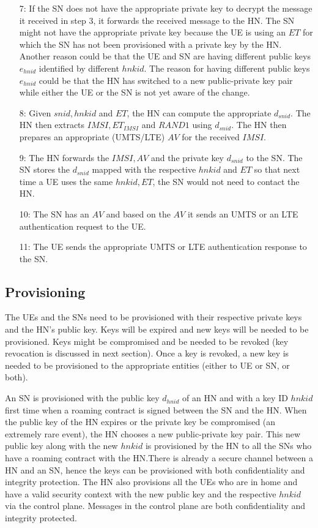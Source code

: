 \documentclass{river-journal}
\begin{document}
\begin{itemize}
\item[7:] If the SN does not have the appropriate private key to decrypt the message it received in step $3$, it forwards the received message to the HN. The SN might not have the appropriate private key because the UE is using an $ET$ for which the SN has not been provisioned with a private key by the HN. Another reason could be that the UE and SN are having different public keys $e_{hnid}$ identified by different $hnkid$. The reason for having different public keys $e_{hnid}$ could be that the HN has switched to a new public-private key pair while either the UE or the SN is not yet aware of the change.
\item[8:] Given $snid,hnkid$ and $ET$, the HN can compute the appropriate $d_{snid}$. The HN then extracts $IMSI,ET_{IMSI}$ and $RAND1$ using $d_{snid}$. The HN then prepares an appropriate (UMTS/LTE) $AV$ for the received $IMSI$.
\item[9:] The HN forwards the $IMSI,AV$ and the private key $d_{snid}$ to the SN. The SN stores the $d_{snid}$ mapped with the respective $hnkid$ and $ET$ so that next time a UE uses the same $hnkid,ET$, the SN would not need to contact the HN.
\item[10:] The SN has an $AV$ and based on the $AV$ it sends an UMTS or an LTE authentication request to the UE.
\item[11:] The UE sends the appropriate UMTS or LTE authentication response to the SN.
\end{itemize}


\subsection{Provisioning}
The UEs and the SNs need to be provisioned with their respective private keys and the HN's public key. Keys will be expired and new keys will be needed to be provisioned. Keys might be compromised and be needed to be revoked (key revocation is discussed in next section). Once a key is revoked, a new key is needed to be provisioned to the appropriate entities (either to UE or SN, or both).

An SN is provisioned with the public key $d_{hnid}$ of an HN and with a key ID $hnkid$ first time when a roaming contract is signed between the SN and the HN. When the public key of the HN expires or the private key be compromised (an extremely rare event), the HN chooses a new public-private key pair. This new public key along with the new $hnkid$ is provisioned by the HN to all the SNs who have a roaming contract with the HN.There is already a secure channel between a HN and an SN, hence the keys can be provisioned with both confidentiality and integrity protection. The HN also provisions all the UEs who are in home and have a valid security context with the new public key and the respective $hnkid$ via the control plane. Messages in the control plane are both confidentiality and integrity protected.
\end{document}
